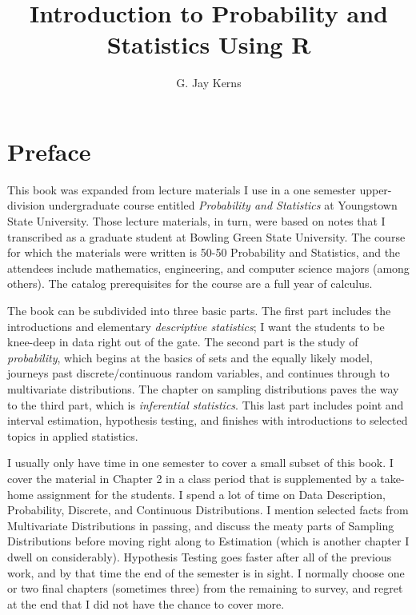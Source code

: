 \documentclass[captions=tableheading]{scrbook}
\title{\fontsize{30}{35}\selectfont Introduction to Probability and Statistics Using \textsf{R}}
\author{\fontsize{24}{28}\selectfont G. Jay Kerns}
\date{\fontsize{24}{28}\selectfont \noun{Second Edition}}
\begin{document}
\maketitle


\chapter*{Preface}

This book was expanded from lecture materials I use in a one semester upper-division undergraduate course entitled \emph{Probability and Statistics} at Youngstown State University. Those lecture materials, in turn, were based on notes that I transcribed as a graduate student at Bowling Green State University. The course for which the materials were written is 50-50 Probability and Statistics, and the attendees include mathematics, engineering, and computer science majors (among others). The catalog prerequisites for the course are a full year of calculus.

The book can be subdivided into three basic parts. The first part includes the introductions and elementary \emph{descriptive statistics}; I want the students to be knee-deep in data right out of the gate. The second part is the study of \emph{probability}, which begins at the basics of sets and the equally likely model, journeys past discrete/continuous  random variables, and continues through to multivariate distributions. The chapter on sampling distributions paves the way to the third part, which is \emph{inferential statistics}. This last part includes point and interval estimation, hypothesis testing, and finishes with introductions to selected topics in applied statistics.

I usually only have time in one semester to cover a small subset of this book. I cover the material in Chapter 2 in a class period that is supplemented by a take-home assignment for the students. I spend a lot of time on Data Description, Probability, Discrete, and Continuous Distributions. I mention selected facts from Multivariate Distributions in passing, and discuss the meaty parts of Sampling Distributions before moving right along to Estimation (which is another chapter I dwell on considerably). Hypothesis Testing goes faster after all of the previous work, and by that time the end of the semester is in sight. I normally choose one or two final chapters (sometimes three) from the remaining to survey, and regret at the end that I did not have the chance to cover more.
\end{document}
